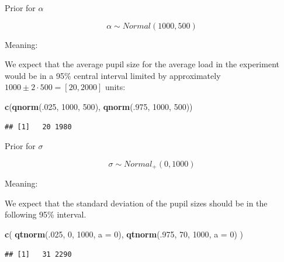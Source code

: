 \documentclass[12pt,ignorenonframetext,aspectratio=169]{beamer}
\newenvironment{Shaded}{\begin{snugshade}}{\end{snugshade}}
\newcommand{\DataTypeTok}[1]{\textcolor[rgb]{0.13,0.29,0.53}{#1}}
\newcommand{\DecValTok}[1]{\textcolor[rgb]{0.00,0.00,0.81}{#1}}
\newcommand{\KeywordTok}[1]{\textcolor[rgb]{0.13,0.29,0.53}{\textbf{#1}}}
\newcommand{\NormalTok}[1]{#1}
\begin{document}
\begin{frame}[fragile]{Prior for \(\alpha\)}
\protect\hypertarget{prior-for-alpha}{}

\begin{equation}
\alpha \sim Normal(1000, 500) 
\end{equation}

\begin{block}{Meaning:}

We expect that the average pupil size for the average load in the experiment would be in a 95\% central interval limited by approximately \(1000 \pm 2 \cdot 500 = [20, 2000]\) units:

\small

\begin{Shaded}
\begin{Highlighting}[]
\KeywordTok{c}\NormalTok{(}\KeywordTok{qnorm}\NormalTok{(.}\DecValTok{025}\NormalTok{, }\DecValTok{1000}\NormalTok{, }\DecValTok{500}\NormalTok{), }\KeywordTok{qnorm}\NormalTok{(.}\DecValTok{975}\NormalTok{, }\DecValTok{1000}\NormalTok{, }\DecValTok{500}\NormalTok{))}
\end{Highlighting}
\end{Shaded}

\begin{verbatim}
## [1]   20 1980
\end{verbatim}

\normalsize

\end{block}

\end{frame}

\begin{frame}[fragile]{Prior for \(\sigma\)}
\protect\hypertarget{prior-for-sigma}{}

\begin{equation}
\sigma \sim Normal_+(0, 1000)
\end{equation}

\begin{block}{Meaning:}

We expect that the standard deviation of the pupil sizes should be in the following 95\% interval.

\small

\begin{Shaded}
\begin{Highlighting}[]
\KeywordTok{c}\NormalTok{(}
  \KeywordTok{qtnorm}\NormalTok{(.}\DecValTok{025}\NormalTok{, }\DecValTok{0}\NormalTok{, }\DecValTok{1000}\NormalTok{, }\DataTypeTok{a =} \DecValTok{0}\NormalTok{),}
  \KeywordTok{qtnorm}\NormalTok{(.}\DecValTok{975}\NormalTok{, }\DecValTok{70}\NormalTok{, }\DecValTok{1000}\NormalTok{, }\DataTypeTok{a =} \DecValTok{0}\NormalTok{)}
\NormalTok{)}
\end{Highlighting}
\end{Shaded}

\begin{verbatim}
## [1]   31 2290
\end{verbatim}

\normalsize

\end{block}

\end{frame}
\end{document}
